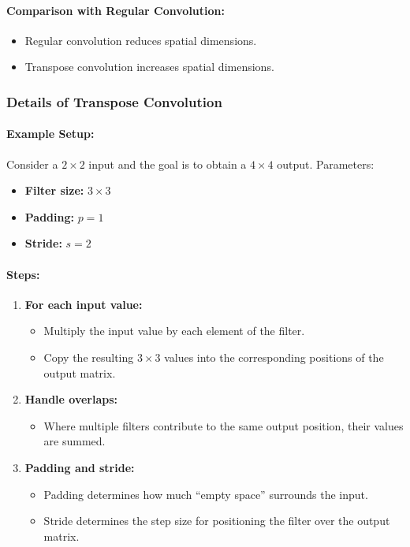 \documentclass[letterpaper,12pt,notitlepage,twoside]{report}
\begin{document}
\paragraph{Comparison with Regular Convolution:}
\begin{itemize}
    \item Regular convolution reduces spatial dimensions.
    \item Transpose convolution increases spatial dimensions.
\end{itemize}

\subsubsection*{Details of Transpose Convolution}
\paragraph{Example Setup:} Consider a $2 \times 2$ input and the goal is to obtain a $4 \times 4$ output. Parameters:
\begin{itemize}[nosep]
    \item \textbf{Filter size:} $3 \times 3$
    \item \textbf{Padding:} $p = 1$
    \item \textbf{Stride:} $s = 2$
\end{itemize}

\paragraph{Steps:}
\begin{enumerate}
    \item \textbf{For each input value:}
    \begin{itemize}
        \item Multiply the input value by each element of the filter.
        \item Copy the resulting $3 \times 3$ values into the corresponding positions of the output matrix.
    \end{itemize}
    \item \textbf{Handle overlaps:}
    \begin{itemize}
        \item Where multiple filters contribute to the same output position, their values are summed.
    \end{itemize}
    \item \textbf{Padding and stride:}
    \begin{itemize}
        \item Padding determines how much ``empty space'' surrounds the input.
        \item Stride determines the step size for positioning the filter over the output matrix.
    \end{itemize}
\end{enumerate}
\end{document}
